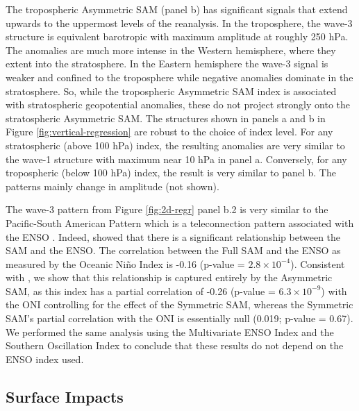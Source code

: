 \documentclass[smallextended]{svjour3}       %
\begin{document}
The tropospheric Asymmetric SAM (panel b) has significant signals that extend upwards to the uppermost levels of the reanalysis. In the troposphere, the wave-3 structure is equivalent barotropic with maximum amplitude at roughly 250 hPa. The anomalies are much more intense in the Western hemisphere, where they extent into the stratosphere. In the Eastern hemisphere the wave-3 signal is weaker and confined to the troposphere while negative anomalies dominate in the stratosphere. So, while the tropospheric Asymmetric SAM index is associated with stratospheric geopotential anomalies, these do not project strongly onto the stratospheric Asymmetric SAM. The structures shown in panels a and b in Figure \ref{fig:vertical-regression} are robust to the choice of index level. For any stratospheric (above 100 hPa) index, the resulting anomalies are very similar to the wave-1 structure with maximum near 10 hPa in panel a. Conversely, for any tropospheric (below 100 hPa) index, the result is very similar to panel b. The patterns mainly change in amplitude (not shown).

The wave-3 pattern from Figure \ref{fig:2d-regr} panel b.2 is very similar to the Pacific-South American Pattern \citep{mo1987, kidson1988} which is a teleconnection pattern associated with the ENSO \citep{karoly1989}. Indeed, \citet{fogt2011} showed that there is a significant relationship between the SAM and the ENSO. The correlation between the Full SAM and the ENSO as measured by the Oceanic Niño Index \citep[ONI,][]{bamston1997} is -0.16 (p-value = \ensuremath{2.8\times 10^{-4}}). Consistent with \citet{fan2007}, we show that this relationship is captured entirely by the Asymmetric SAM, as this index has a partial correlation of -0.26 (p-value = \ensuremath{6.3\times 10^{-9}}) with the ONI controlling for the effect of the Symmetric SAM, whereas the Symmetric SAM's partial correlation with the ONI is essentially null (0.019; p-value = 0.67). We performed the same analysis using the Multivariate ENSO Index \citep{wolter2011} and the Southern Oscillation Index \citep{ropelewski1987} to conclude that these results do not depend on the ENSO index used.

\hypertarget{impacts}{%
\subsection{Surface Impacts}\label{impacts}}
\end{document}
